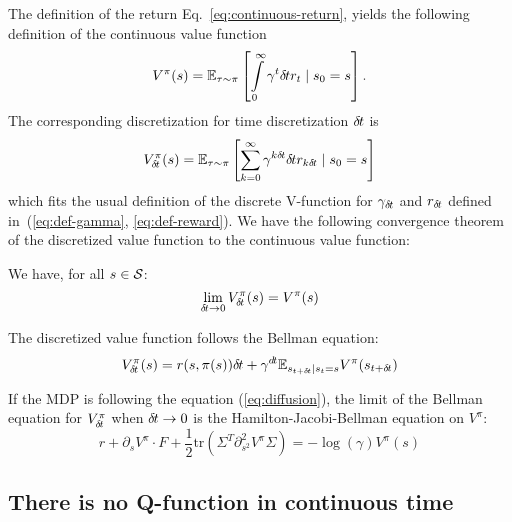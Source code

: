 The definition of the return Eq.~\eqref{eq:continuous-return}, yields the
following definition of the continuous value function
\begin{equation}
  V^\pi(s) = \mathbb{E}_{\tau\sim\pi}\left[\int\limits_{0}^\infty \gamma^{t}{\delta\hspace{-.1em}t} r_{t} \mid s_0 = s\right].
\end{equation}
The corresponding discretization for time discretization ${\delta\hspace{-.1em}t}$ is
\begin{equation}
  V^\pi_{\delta\hspace{-.1em}t}(s) = \mathbb{E}_{\tau\sim\pi}\left[\sum\limits_{k=0}^\infty \gamma^{k{\delta\hspace{-.1em}t}}{\delta\hspace{-.1em}t} r_{k{\delta\hspace{-.1em}t}} \mid s_0 = s\right]
\end{equation}
which fits the usual definition of the discrete V-function for $\gamma_{\delta\hspace{-.1em}t}$ and
$r_{\delta\hspace{-.1em}t}$ defined in~(\ref{eq:def-gamma}, \ref{eq:def-reward}).
We have the following convergence theorem of the discretized value function to the continuous value function:
  \begin{theorem}
    We have, for all $s \in {\cal S}$:
    \begin{equation}
      \label{eq:conv-value}
      \lim_{{\delta\hspace{-.1em}t} \rightarrow 0} V^\pi_{\delta\hspace{-.1em}t}(s) = V^\pi(s)
    \end{equation}
  \end{theorem}

The discretized value function follows the Bellman equation:
\begin{equation}
  \label{eq:bellman}
  V^\pi_{\delta\hspace{-.1em}t}(s) = {r}(s, \pi(s)){\delta\hspace{-.1em}t} + \gamma^{d\hspace{-.1em}t} \mathbb{E}_{s_{t+{\delta\hspace{-.1em}t}} | s_t = s} V^\pi(s_{t+{\delta\hspace{-.1em}t}})
\end{equation}

If the MDP is following the equation (\ref{eq:diffusion}), the limit of the Bellman equation for $V^\pi_{\delta\hspace{-.1em}t}$ when ${\delta\hspace{-.1em}t} \rightarrow 0$ is the Hamilton-Jacobi-Bellman equation on $V^\pi$:
\begin{equation}
  \label{eq:hamilton-jacobi-bellman}
  r + \partial_s V^\pi \cdot F + \frac{1}{2} \text{tr}\left(\Sigma^T\partial^2_{s^2} V^\pi\Sigma\right) = - \log(\gamma) V^\pi(s)
\end{equation}


\subsection{There is no Q-function in continuous time}


